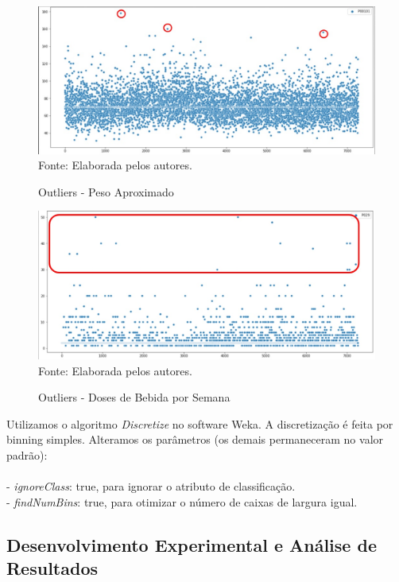 \documentclass[12pt]{article}
\begin{document}
\begin{figure}[h]
    \centering
    \caption{Outliers - Peso Aproximado}
    \includegraphics[scale=0.45]{Outliers_peso_aproximado.jpg}\\
    {\footnotesize Fonte: Elaborada pelos autores.}
    \label{fig:outliers_peso_aproximado}
\end{figure}

\begin{figure}[h]
    \centering
    \caption{Outliers - Doses de Bebida por Semana}
    \includegraphics[scale=0.45]{Outliers_doses_bebida_semana.jpg}\\
    {\footnotesize Fonte: Elaborada pelos autores.}
    \label{fig:outliers_doses_bebidas_semana}
\end{figure}

Utilizamos o algoritmo \textit{Discretize} no software Weka. A discretização é feita por binning simples. Alteramos os parâmetros (os demais permaneceram no valor padrão):\\\\
- \textit{ignoreClass}: true, para ignorar o atributo de classificação.\\
- \textit{findNumBins}: true, para otimizar o número de caixas de largura igual.

\subsection{Desenvolvimento Experimental e Análise de Resultados}
\end{document}

